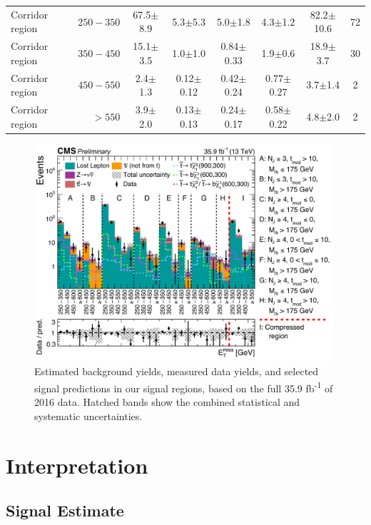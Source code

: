 \begin{table}[htbp]
{\begin{tabular}{|r|r|r|r|c|c|c|c|c|c|}
\hline
\multicolumn{3}{|l|}{Corridor region} & $250-350$ & 67.5$\pm$8.9 & 5.3$\pm$5.3 & 5.0$\pm$1.8 & 4.3$\pm$1.2 & 82.2$\pm$10.6 & 72 \\
\multicolumn{3}{|l|}{Corridor region} & $350-450$ & 15.1$\pm$3.5 & 1.0$\pm$1.0 & 0.84$\pm$0.33 & 1.9$\pm$0.6 & 18.9$\pm$3.7 & 30 \\
\multicolumn{3}{|l|}{Corridor region} & $450-550$ & 2.4$\pm$1.3 & 0.12$\pm$0.12 & 0.42$\pm$0.24 & 0.77$\pm$0.27 & 3.7$\pm$1.4 & 2 \\
\multicolumn{3}{|l|}{Corridor region} &    $>550$ & 3.9$\pm$2.0 & 0.13$\pm$0.13 & 0.24$\pm$0.17 & 0.58$\pm$0.22 & 4.8$\pm$2.0 & 2 \\
\hline
\end{tabular}}
\end{table}

\begin{figure}[htb]
\centering
\includegraphics[width=0.99\textwidth]{figures/ResultPlot_Moriond2017.pdf}
\caption{Estimated background yields, measured data yields, and
  selected signal predictions in our signal regions, based on the full
  35.9 fb\textsuperscript{-1} of 2016 data. Hatched bands show the
  combined statistical and systematic uncertainties.}
\label{fig:stop:results}
\end{figure}

\section{Interpretation}
\label{sec:stop:interp}

\subsection{Signal Estimate}
\label{ssec:stop:signal}

